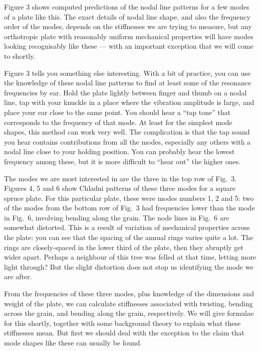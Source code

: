   Figure 3 shows computed predictions of the nodal line patterns for a few 
  modes of a plate like this. The exact details of nodal line shape, and also 
  the frequency order of the modes, depends on the stiffnesses we are trying to 
  measure, but any orthotropic plate with reasonably uniform mechanical 
  properties will have modes looking recognisably like these — with an 
  important exception that we will come to shortly. 

  Figure 3 tells you something else interesting. With a bit of practice, you 
  can use the knowledge of these nodal line patterns to find at least some of 
  the resonance frequencies by ear. Hold the plate lightly between finger and 
  thumb on a nodal line, tap with your knuckle in a place where the vibration 
  amplitude is large, and place your ear close to the same point. You should 
  hear a “tap tone” that corresponds to the frequency of that mode. At least 
  for the simplest mode shapes, this method can work very well. The 
  complication is that the tap sound you hear contains contributions from all 
  the modes, especially any others with a nodal line close to your holding 
  position. You can probably hear the lowest frequency among these, but it is 
  more difficult to “hear out” the higher ones. 

  The modes we are most interested in are the three in the top row of Fig.\ 3. 
  Figures 4, 5 and 6 show Chladni patterns of these three modes for a square 
  spruce plate. For this particular plate, these were modes numbers 1, 2 and 5: 
  two of the modes from the bottom row of Fig.\ 3 had frequencies lower than 
  the mode in Fig.\ 6, involving bending along the grain. The node lines in 
  Fig.\ 6 are somewhat distorted. This is a result of variation of mechanical 
  properties across the plate: you can see that the spacing of the annual rings 
  varies quite a lot. The rings are closely-spaced in the lower third of the 
  plate, then they abruptly get wider apart. Perhaps a neighbour of this tree 
  was felled at that time, letting more light through? But the slight 
  distortion does not stop us identifying the mode we are after. 

  From the frequencies of these three modes, plus knowledge of the dimensions 
  and weight of the plate, we can calculate stiffnesses associated with 
  twisting, bending across the grain, and bending along the grain, 
  respectively. We will give formulae for this shortly, together with some 
  background theory to explain what these stiffnesses mean. But first we should 
  deal with the exception to the claim that mode shapes like these can usually 
  be found. 

